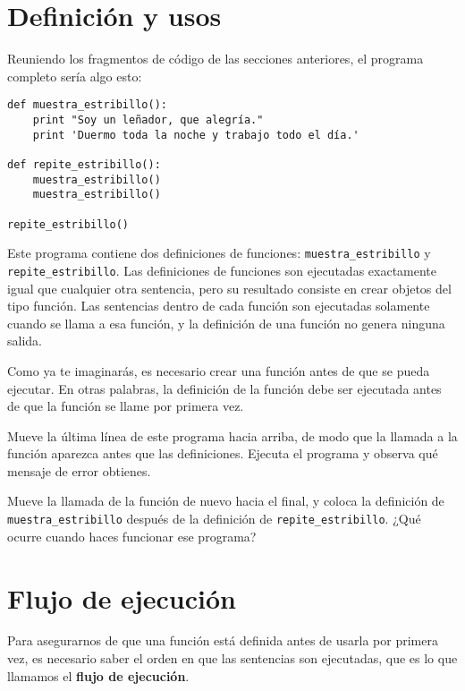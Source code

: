 \section{Definición y usos}

Reuniendo los fragmentos de código de las secciones anteriores, el
programa completo sería algo esto:

\beforeverb
\begin{verbatim}
def muestra_estribillo():
    print "Soy un leñador, que alegría."
    print 'Duermo toda la noche y trabajo todo el día.'

def repite_estribillo():
    muestra_estribillo()
    muestra_estribillo()

repite_estribillo()
\end{verbatim}
\afterverb
%
Este programa contiene dos definiciones de funciones: \verb"muestra_estribillo" y
\verb"repite_estribillo". Las definiciones de funciones son ejecutadas exactamente
igual que cualquier otra sentencia, pero su resultado consiste en crear objetos del tipo función. Las
sentencias dentro de cada función son ejecutadas solamente cuando se llama a esa función,
y la definición de una función no genera ninguna salida.


Como ya te imaginarás, es necesario crear una función antes de que se
pueda ejecutar. En otras palabras, la definición de la función debe ser
ejecutada antes de que la función se llame por primera vez.

\begin{ex}
Mueve la última línea de este programa
hacia arriba, de modo que la llamada a la función aparezca antes que las
definiciones. Ejecuta
el programa y observa qué mensaje
de error obtienes.
\end{ex}

\begin{ex}
Mueve la llamada de la función de nuevo hacia el final,
y coloca la definición de \verb"muestra_estribillo" después de la definición
de \verb"repite_estribillo". ¿Qué ocurre cuando haces funcionar ese programa?
\end{ex}


\section{Flujo de ejecución}

Para asegurarnos de que una función está definida antes de usarla por primera vez,
es necesario saber el orden en que las sentencias son ejecutadas, que es lo
que llamamos el {\bf flujo de ejecución}.

